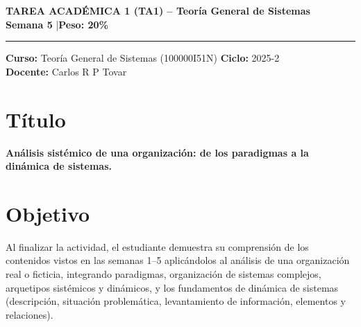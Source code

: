 \documentclass[11pt,a4paper]{article}
\begin{document}
\begin{center}
{\LARGE \textbf{TAREA ACADÉMICA 1 (TA1) -- Teoría General de Sistemas}}\\[6pt]
{\large \textbf{Semana 5} \quad|\quad \textbf{Peso: 20\%}}\\[2pt]
\rule{0.95\linewidth}{0.4pt}
\end{center}

\vspace{4pt}
\noindent \textbf{Curso:} Teoría General de Sistemas (100000I51N) \hfill \textbf{Ciclo:} 2025-2\\
\noindent \textbf{Docente:} Carlos R P Tovar \\

\section*{Título}
\textbf{Análisis sistémico de una organización: de los paradigmas a la dinámica de sistemas.}

\section*{Objetivo}
Al finalizar la actividad, el estudiante demuestra su comprensión de los contenidos vistos en las semanas 1--5 aplicándolos al análisis de una organización real o ficticia, integrando paradigmas, organización de sistemas complejos, arquetipos sistémicos y dinámicos, y los fundamentos de dinámica de sistemas (descripción, situación problemática, levantamiento de información, elementos y relaciones).
\end{document}
